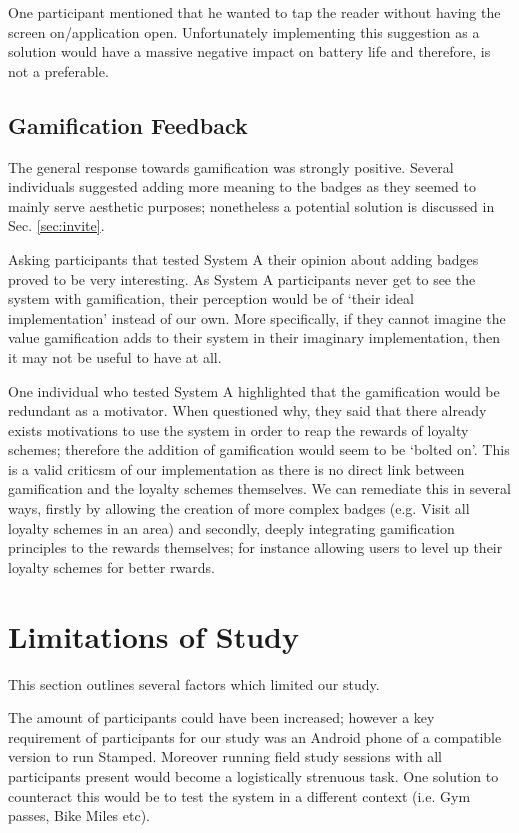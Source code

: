 One participant mentioned that he wanted to tap the reader without having the screen on/application open. Unfortunately implementing this suggestion as a solution would have a massive negative impact on battery life and therefore, is not a preferable.
\subsection{Gamification Feedback}
The general response towards gamification was strongly positive. Several individuals suggested adding more meaning to the badges as they seemed to mainly serve aesthetic purposes; nonetheless   a potential solution is discussed in Sec. \ref{sec:invite}.

Asking participants that tested System A their opinion about adding badges proved to be very interesting. As System A participants never get to see the system with gamification, their perception would be of `their ideal implementation' instead of our own. More specifically, if they cannot imagine the value gamification adds to their system in their imaginary implementation, then it may not be useful to have at all.

One individual who tested System A highlighted that the gamification would be redundant as a motivator. When questioned why, they said that there already exists motivations to use the system in order to reap the rewards of loyalty schemes; therefore the addition of gamification would seem to be `bolted on'. This is a valid criticsm of our implementation as there is no direct link between gamification and the loyalty schemes themselves. We can remediate this in several ways, firstly by allowing the creation of more complex badges (e.g. Visit all loyalty schemes in an area) and secondly, deeply integrating gamification principles to the rewards themselves; for instance allowing users to level up their loyalty schemes for better rwards.

\section{Limitations of Study}
This section outlines several factors which limited our study.

The amount of participants could have been increased; however a key requirement of participants for our study was an Android phone of a compatible version to run Stamped. Moreover running field study sessions with all participants present would become a logistically strenuous task. One solution to counteract this would be to test the system in a different context (i.e. Gym passes, Bike Miles etc).

